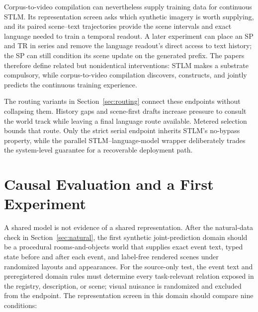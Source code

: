 \documentclass[11pt]{article}
\begin{document}
Corpus-to-video compilation can nevertheless supply training data for continuous STLM. Its representation screen asks which synthetic imagery is worth supplying, and its paired scene--text trajectories provide the scene intervals and exact language needed to train a temporal readout. A later experiment can place an SP and TR in series and remove the language readout's direct access to text history; the SP can still condition its scene update on the generated prefix. The papers therefore define related but nonidentical interventions: STLM makes a substrate compulsory, while corpus-to-video compilation discovers, constructs, and jointly predicts the continuous training experience.

The routing variants in Section~\ref{sec:routing} connect these endpoints without collapsing them. History gaps and scene-first drafts increase pressure to consult the world track while leaving a final language route available. Metered selection bounds that route. Only the strict serial endpoint inherits STLM's no-bypass property, while the parallel STLM--language-model wrapper deliberately trades the system-level guarantee for a recoverable deployment path.

\section{Causal Evaluation and a First Experiment}
\label{sec:evaluation}

A shared model is not evidence of a shared representation. After the natural-data check in Section~\ref{sec:natural}, the first synthetic joint-prediction domain should be a procedural rooms-and-objects world that supplies exact event text, typed state before and after each event, and label-free rendered scenes under randomized layouts and appearances. For the source-only test, the event text and preregistered domain rules must determine every task-relevant relation exposed in the registry, description, or scene; visual nuisance is randomized and excluded from the endpoint. The representation screen in this domain should compare nine conditions:
\end{document}
